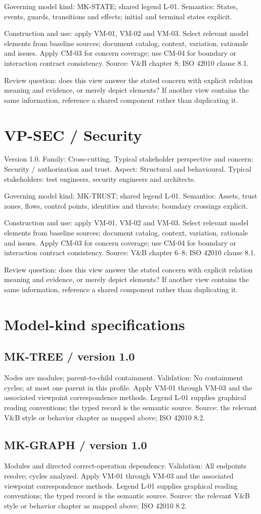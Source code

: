 \documentclass[11pt,letterpaper]{article}
\newcommand{\docsection}[1]{\Needspace{5\baselineskip}\section{#1}}
\newcommand{\docsub}[1]{\Needspace{4\baselineskip}\subsection{#1}}
\begin{document}
Governing model kind: MK-STATE; shared legend L-01. Semantics: States, events, guards, transitions and effects; initial and terminal states explicit.

Construction and use: apply VM-01, VM-02 and VM-03. Select relevant model elements from baseline sources; document catalog, context, variation, rationale and issues. Apply CM-03 for concern coverage; use CM-04 for boundary or interaction contract consistency. Source: V\&B chapter 8; ISO 42010 clause 8.1.

Review question: does this view answer the stated concern with explicit relation meaning and evidence, or merely depict elements? If another view contains the same information, reference a shared component rather than duplicating it.

\docsection{VP-SEC / Security}
Version 1.0. Family: Cross-cutting. Typical stakeholder perspective and concern: Security / authorization and trust. Aspect: Structural and behavioural. Typical stakeholders: test engineers, security engineers and architects.

Governing model kind: MK-TRUST; shared legend L-01. Semantics: Assets, trust zones, flows, control points, identities and threats; boundary crossings explicit.

Construction and use: apply VM-01, VM-02 and VM-03. Select relevant model elements from baseline sources; document catalog, context, variation, rationale and issues. Apply CM-03 for concern coverage; use CM-04 for boundary or interaction contract consistency. Source: V\&B chapter 6--8; ISO 42010 clause 8.1.

Review question: does this view answer the stated concern with explicit relation meaning and evidence, or merely depict elements? If another view contains the same information, reference a shared component rather than duplicating it.

\docsection{Model-kind specifications}
\docsub{MK-TREE / version 1.0}
Nodes are modules; parent-to-child containment. Validation: No containment cycles; at most one parent in this profile. Apply VM-01 through VM-03 and the associated viewpoint correspondence methods. Legend L-01 supplies graphical reading conventions; the typed record is the semantic source. Source: the relevant V\&B style or behavior chapter as mapped above; ISO 42010 8.2.

\docsub{MK-GRAPH / version 1.0}
Modules and directed correct-operation dependency. Validation: All endpoints resolve; cycles analyzed. Apply VM-01 through VM-03 and the associated viewpoint correspondence methods. Legend L-01 supplies graphical reading conventions; the typed record is the semantic source. Source: the relevant V\&B style or behavior chapter as mapped above; ISO 42010 8.2.
\end{document}
